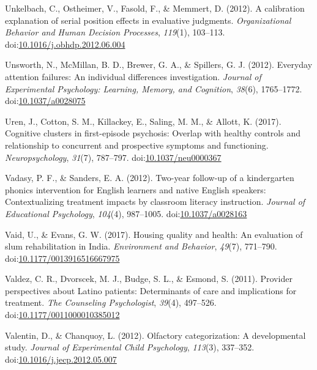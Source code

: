 \documentclass[english,man]{apa6}
\theoremstyle{definition}
\theoremstyle{definition}
\theoremstyle{definition}
\theoremstyle{remark}
\begin{document}
\hypertarget{ref-Unkelbach2012}{}
Unkelbach, C., Ostheimer, V., Fasold, F., \& Memmert, D. (2012). A
calibration explanation of serial position effects in evaluative
judgments. \emph{Organizational Behavior and Human Decision Processes},
\emph{119}(1), 103--113.
doi:\href{https://doi.org/10.1016/j.obhdp.2012.06.004}{10.1016/j.obhdp.2012.06.004}

\hypertarget{ref-Unsworth2012}{}
Unsworth, N., McMillan, B. D., Brewer, G. A., \& Spillers, G. J. (2012).
Everyday attention failures: An individual differences investigation.
\emph{Journal of Experimental Psychology: Learning, Memory, and
Cognition}, \emph{38}(6), 1765--1772.
doi:\href{https://doi.org/10.1037/a0028075}{10.1037/a0028075}

\hypertarget{ref-Uren2017}{}
Uren, J., Cotton, S. M., Killackey, E., Saling, M. M., \& Allott, K.
(2017). Cognitive clusters in first-episode psychosis: Overlap with
healthy controls and relationship to concurrent and prospective symptoms
and functioning. \emph{Neuropsychology}, \emph{31}(7), 787--797.
doi:\href{https://doi.org/10.1037/neu0000367}{10.1037/neu0000367}

\hypertarget{ref-Vadasy2012}{}
Vadasy, P. F., \& Sanders, E. A. (2012). Two-year follow-up of a
kindergarten phonics intervention for English learners and native
English speakers: Contextualizing treatment impacts by classroom
literacy instruction. \emph{Journal of Educational Psychology},
\emph{104}(4), 987--1005.
doi:\href{https://doi.org/10.1037/a0028163}{10.1037/a0028163}

\hypertarget{ref-Vaid2017}{}
Vaid, U., \& Evans, G. W. (2017). Housing quality and health: An
evaluation of slum rehabilitation in India. \emph{Environment and
Behavior}, \emph{49}(7), 771--790.
doi:\href{https://doi.org/10.1177/0013916516667975}{10.1177/0013916516667975}

\hypertarget{ref-Valdez2011}{}
Valdez, C. R., Dvorscek, M. J., Budge, S. L., \& Esmond, S. (2011).
Provider perspectives about Latino patients: Determinants of care and
implications for treatment. \emph{The Counseling Psychologist},
\emph{39}(4), 497--526.
doi:\href{https://doi.org/10.1177/0011000010385012}{10.1177/0011000010385012}

\hypertarget{ref-Valentin2012}{}
Valentin, D., \& Chanquoy, L. (2012). Olfactory categorization: A
developmental study. \emph{Journal of Experimental Child Psychology},
\emph{113}(3), 337--352.
doi:\href{https://doi.org/10.1016/j.jecp.2012.05.007}{10.1016/j.jecp.2012.05.007}
\end{document}
